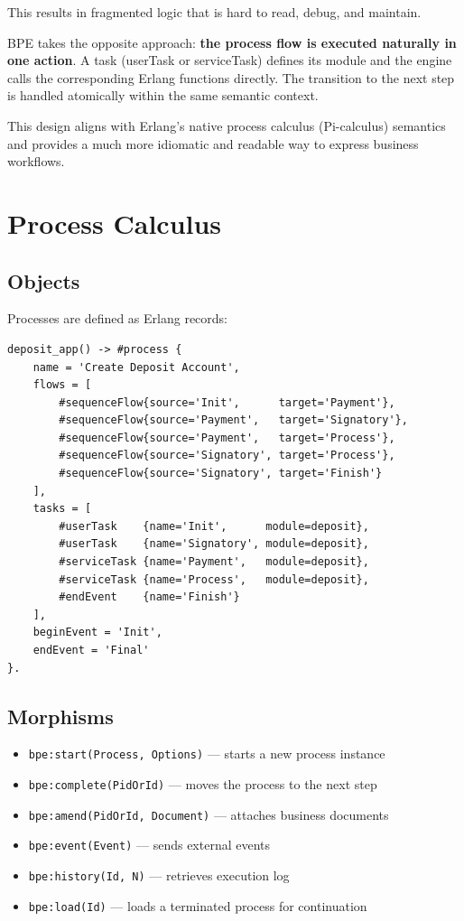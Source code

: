 \documentclass[11pt,a4paper]{article}
\begin{document}
This results in fragmented logic that is hard to read, debug, and maintain.

BPE takes the opposite approach: \textbf{the process flow is executed naturally in one action}.
A task (userTask or serviceTask) defines its module and the engine calls the corresponding Erlang functions directly.
The transition to the next step is handled atomically within the same semantic context.

This design aligns with Erlang’s native process calculus (Pi-calculus) semantics
and provides a much more idiomatic and readable way to express business workflows.

\newpage
\section{Process Calculus}

\subsection{Objects}

Processes are defined as Erlang records:

\begin{lstlisting}
deposit_app() -> #process {
    name = 'Create Deposit Account',
    flows = [
        #sequenceFlow{source='Init',      target='Payment'},
        #sequenceFlow{source='Payment',   target='Signatory'},
        #sequenceFlow{source='Payment',   target='Process'},
        #sequenceFlow{source='Signatory', target='Process'},
        #sequenceFlow{source='Signatory', target='Finish'}
    ],
    tasks = [
        #userTask    {name='Init',      module=deposit},
        #userTask    {name='Signatory', module=deposit},
        #serviceTask {name='Payment',   module=deposit},
        #serviceTask {name='Process',   module=deposit},
        #endEvent    {name='Finish'}
    ],
    beginEvent = 'Init',
    endEvent = 'Final'
}.
\end{lstlisting}

\subsection{Morphisms}

\begin{itemize}
    \item \texttt{bpe:start(Process, Options)} — starts a new process instance
    \item \texttt{bpe:complete(PidOrId)} — moves the process to the next step
    \item \texttt{bpe:amend(PidOrId, Document)} — attaches business documents
    \item \texttt{bpe:event(Event)} — sends external events
    \item \texttt{bpe:history(Id, N)} — retrieves execution log
    \item \texttt{bpe:load(Id)} — loads a terminated process for continuation
\end{itemize}
\end{document}
